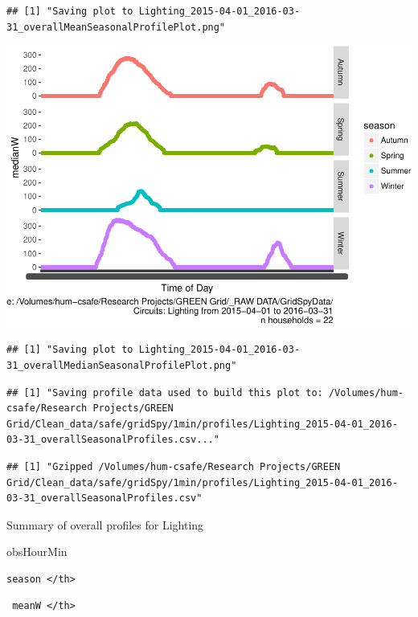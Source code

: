 \documentclass[]{article}
\begin{document}
\begin{verbatim}
## [1] "Saving plot to Lighting_2015-04-01_2016-03-31_overallMeanSeasonalProfilePlot.png"
\end{verbatim}

\includegraphics{nzGGHouseholdPowerDemandProfile_Lighting_2015-04-01_2016-03-31_files/figure-latex/overall profiles by season-2.pdf}

\begin{verbatim}
## [1] "Saving plot to Lighting_2015-04-01_2016-03-31_overallMedianSeasonalProfilePlot.png"
\end{verbatim}

\begin{verbatim}
## [1] "Saving profile data used to build this plot to: /Volumes/hum-csafe/Research Projects/GREEN Grid/Clean_data/safe/gridSpy/1min/profiles/Lighting_2015-04-01_2016-03-31_overallSeasonalProfiles.csv..."
\end{verbatim}

\begin{verbatim}
## [1] "Gzipped /Volumes/hum-csafe/Research Projects/GREEN Grid/Clean_data/safe/gridSpy/1min/profiles/Lighting_2015-04-01_2016-03-31_overallSeasonalProfiles.csv"
\end{verbatim}

Summary of overall profiles for Lighting

obsHourMin

\begin{verbatim}
season </th>
\end{verbatim}

\begin{verbatim}
 meanW </th>
\end{verbatim}
\end{document}
